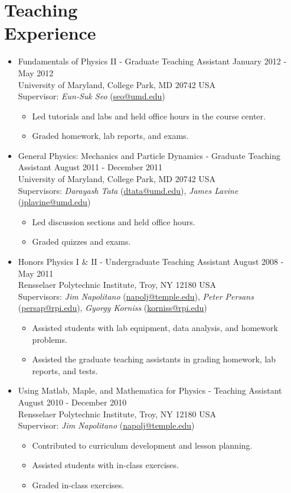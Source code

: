 \section{Teaching\\Experience}
\begin{itemize}[leftmargin=12pt]
\item Fundamentals of Physics II - Graduate Teaching Assistant \hfill January 2012 - May 2012\\
University of Maryland, College Park, MD 20742 USA\\
Supervisor: {\sl Eun-Suk Seo} (\href{mailto:seo@umd.edu}{seo@umd.edu})
\begin{itemize}
\item Led tutorials and labs and held office hours in the course center.
\item Graded homework, lab reports, and exams.
\end{itemize}
\item General Physics: Mechanics and Particle Dynamics - Graduate Teaching Assistant \hfill August 2011 - December 2011\\
University of Maryland, College Park, MD 20742 USA\\
Supervisors: {\sl Darayash Tata} (\href{mailto:dtata@umd.edu}{dtata@umd.edu}), {\sl James Lavine} (\href{mailto:jplavine@umd.edu}{jplavine@umd.edu})
\begin{itemize}
\item Led discussion sections and held office hours.
\item Graded quizzes and exams.
\end{itemize}
\item Honors Physics I \& II - Undergraduate Teaching Assistant \hfill August 2008 - May 2011\\
Rensselaer Polytechnic Institute, Troy, NY 12180 USA\\
Supervisors: {\sl Jim Napolitano} (\href{mailto:napolj@temple.edu}{napolj@temple.edu}), {\sl Peter Persans} (\href{mailto:persap@rpi.edu}{persap@rpi.edu}), {\sl Gyorgy Korniss} (\href{mailto:korniss@rpi.edu}{korniss@rpi.edu})
\begin{itemize}
\item Assisted students with lab equipment, data analysis, and homework problems.
\item Assisted the graduate teaching assistants in grading homework, lab reports, and tests.
\end{itemize}
\item Using Matlab, Maple, and Mathematica for Physics - Teaching Assistant \hfill August 2010 - December 2010\\
Rensselaer Polytechnic Institute, Troy, NY 12180 USA\\
Supervisor: {\sl Jim Napolitano} (\href{mailto:napolj@temple.edu}{napolj@temple.edu})
\begin{itemize}
\item Contributed to curriculum development and lesson planning.
\item Assisted students with in-class exercises.
\item Graded in-class exercises.
\end{itemize}
\end{itemize}